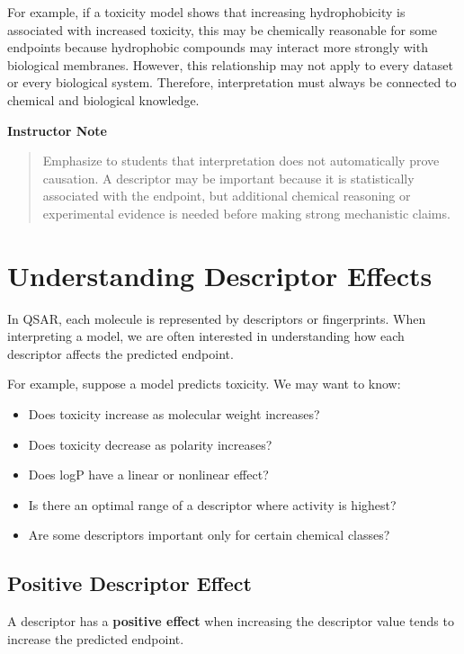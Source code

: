 \documentclass[11pt]{report}
\newenvironment{Important note}{\begin{quote}\color{red}\textbf{Important note:} }{\end{quote}}
\newenvironment{instructornote}
{\vspace{0.5em}\noindent\textbf{Instructor Note}\begin{quote}}
{\end{quote}\vspace{0.5em}}
\begin{document}
For example, if a toxicity model shows that increasing hydrophobicity is associated with increased toxicity, this may be chemically reasonable for some endpoints because hydrophobic compounds may interact more strongly with biological membranes. However, this relationship may not apply to every dataset or every biological system. Therefore, interpretation must always be connected to chemical and biological knowledge.

\begin{instructornote}
Emphasize to students that interpretation does not automatically prove causation. A descriptor may be important because it is statistically associated with the endpoint, but additional chemical reasoning or experimental evidence is needed before making strong mechanistic claims.
\end{instructornote}

\section{Understanding Descriptor Effects}

In QSAR, each molecule is represented by descriptors or fingerprints. When interpreting a model, we are often interested in understanding how each descriptor affects the predicted endpoint.

For example, suppose a model predicts toxicity. We may want to know:

\begin{itemize}[leftmargin=*]
    \item Does toxicity increase as molecular weight increases?
    \item Does toxicity decrease as polarity increases?
    \item Does logP have a linear or nonlinear effect?
    \item Is there an optimal range of a descriptor where activity is highest?
    \item Are some descriptors important only for certain chemical classes?
\end{itemize}

\subsection{Positive Descriptor Effect}

A descriptor has a \textbf{positive effect} when increasing the descriptor value tends to increase the predicted endpoint.
\end{document}
